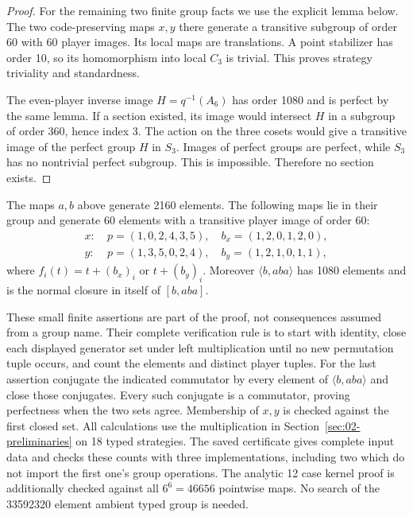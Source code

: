 \begin{proof}
For the remaining two finite group facts we use the explicit lemma below.
The two code-preserving maps $x,y$ there generate a transitive subgroup of
order 60 with 60 player images. Its local maps are translations. A point
stabilizer has order 10, so its homomorphism into local $C_3$ is trivial.
This proves strategy triviality and standardness.

The even-player inverse image $H=q^{-1}(A_6)$ has order 1080 and is perfect by
the same lemma. If a section existed, its image would intersect $H$ in a
subgroup of order 360, hence index 3. The action on the three cosets would
give a transitive image of the perfect group $H$ in $S_3$. Images of perfect
groups are perfect, while $S_3$ has no nontrivial perfect subgroup. This is
impossible. Therefore no section exists.
\end{proof}

\begin{lemma}\label{lem:sixcert}
The maps $a,b$ above generate 2160 elements. The following maps lie in their
group and generate 60 elements with a transitive player image of order 60:
\[
\begin{split}
x:&\ p=(1,0,2,4,3,5),\quad b_x=(1,2,0,1,2,0),\\
y:&\ p=(1,3,5,0,2,4),\quad b_y=(1,2,1,0,1,1),
\end{split}
\]
where $f_i(t)=t+(b_x)_i$ or $t+(b_y)_i$. Moreover $\langle b,aba\rangle$
has 1080 elements and is the normal closure in itself of $[b,aba]$.
\end{lemma}
These small finite assertions are part of the proof, not consequences assumed
from a group name. Their complete verification rule is to start with identity,
close each displayed generator set under left multiplication until no new
permutation tuple occurs, and count the elements and distinct player tuples.
For the last assertion conjugate the indicated commutator by every element
of $\langle b,aba\rangle$ and close those conjugates. Every such conjugate is
a commutator, proving perfectness when the two sets agree. Membership of $x,y$
is checked against the first closed set. All calculations use the multiplication
in Section~\ref{sec:02-preliminaries} on 18 typed strategies. The saved certificate gives complete
input data and checks these counts with three implementations, including two
which do not import the first one's group operations. The analytic 12 case
kernel proof is additionally checked against all $6^6=46656$ pointwise maps.
No search of the 33592320 element ambient typed group is needed.


